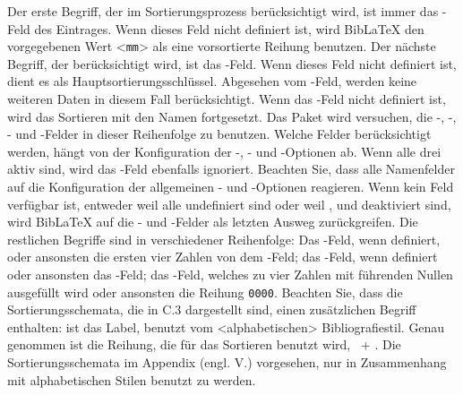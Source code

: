 \documentclass{ltxdockit}[2011/03/25]
\newcommand*{\biblatex}{BibLaTeX\xspace}
\begin{document}
Der erste Begriff, der im Sortierungsprozess berücksichtigt wird, ist immer das
-Feld des Eintrages. Wenn dieses Feld nicht definiert ist,
wird \biblatex den vorgegebenen Wert <\texttt{mm}> als eine vorsortierte
Reihung benutzen. Der nächste Begriff, der berücksichtigt wird, ist das
-Feld. Wenn dieses Feld nicht definiert ist, dient es als
Hauptsortierungsschlüssel. Abgesehen vom -Feld, werden keine
weiteren Daten in diesem Fall berücksichtigt. Wenn das -Feld
nicht definiert ist, wird das Sortieren mit den Namen fortgesetzt. Das Paket
wird versuchen, die -, -,
- und -Felder in dieser Reihenfolge zu benutzen.
Welche Felder
berücksichtigt werden, hängt von der Konfiguration der -,
- und -Optionen ab. Wenn alle drei aktiv sind,
wird das -Feld ebenfalls ignoriert. Beachten Sie, dass alle
Namenfelder auf die Konfiguration der allgemeinen - und
-Optionen reagieren. Wenn kein Feld verfügbar ist, entweder weil
alle undefiniert sind oder weil ,  und
 deaktiviert sind, wird \biblatex auf die
- und -Felder als letzten Ausweg
zurückgreifen. Die restlichen Begriffe sind in verschiedener Reihenfolge: Das
-Feld, wenn definiert, oder ansonsten die ersten vier Zahlen
von dem -Feld; das -Feld, wenn definiert oder
ansonsten das -Feld; das -Feld, welches zu vier
Zahlen mit führenden Nullen ausgefüllt wird oder ansonsten die Reihung
\texttt{0000}. Beachten Sie, dass die Sortierungsschemata, die in C.3 %
dargestellt sind, einen zusätzlichen Begriff enthalten:  ist das
Label, benutzt vom <alphabetischen> Bibliografiestil. Genau genommen ist die
Reihung, die für das Sortieren benutzt wird, ~+
. Die Sortierungsschemata im Appendix (engl. V.) %
vorgesehen, nur in Zusammenhang mit alphabetischen Stilen benutzt zu werden.                            
\end{document}

